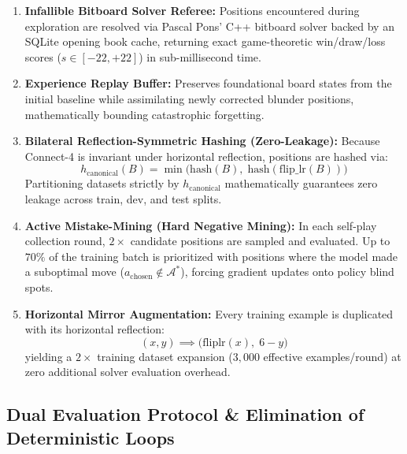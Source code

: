 \documentclass[11pt,a4paper]{article}
\begin{document}
\begin{enumerate}[leftmargin=1.2cm]
    \item \textbf{Infallible Bitboard Solver Referee:} Positions encountered during exploration are resolved via Pascal Pons' C++ bitboard solver backed by an SQLite opening book cache, returning exact game-theoretic win/draw/loss scores ($s \in [-22, +22]$) in sub-millisecond time.
    \item \textbf{Experience Replay Buffer:} Preserves foundational board states from the initial baseline while assimilating newly corrected blunder positions, mathematically bounding catastrophic forgetting.
    \item \textbf{Bilateral Reflection-Symmetric Hashing (Zero-Leakage):} Because Connect-4 is invariant under horizontal reflection, positions are hashed via:
    \[
        h_\text{canonical}(B) = \min\bigl(\mathrm{hash}(B),\; \mathrm{hash}(\mathrm{flip\_lr}(B))\bigr)
    \]
    Partitioning datasets strictly by $h_\text{canonical}$ mathematically guarantees zero leakage across train, dev, and test splits.
    \item \textbf{Active Mistake-Mining (Hard Negative Mining):} In each self-play collection round, $2\times$ candidate positions are sampled and evaluated. Up to $70\%$ of the training batch is prioritized with positions where the model made a suboptimal move ($a_\text{chosen} \notin \mathcal{A}^*$), forcing gradient updates onto policy blind spots.
    \item \textbf{Horizontal Mirror Augmentation:} Every training example is duplicated with its horizontal reflection:
    \[
        (x, y) \implies \bigl(\mathrm{fliplr}(x),\; 6 - y\bigr)
    \]
    yielding a $2\times$ training dataset expansion ($3{,}000$ effective examples/round) at zero additional solver evaluation overhead.
\end{enumerate}

\subsection{Dual Evaluation Protocol \& Elimination of Deterministic Loops}
\end{document}
